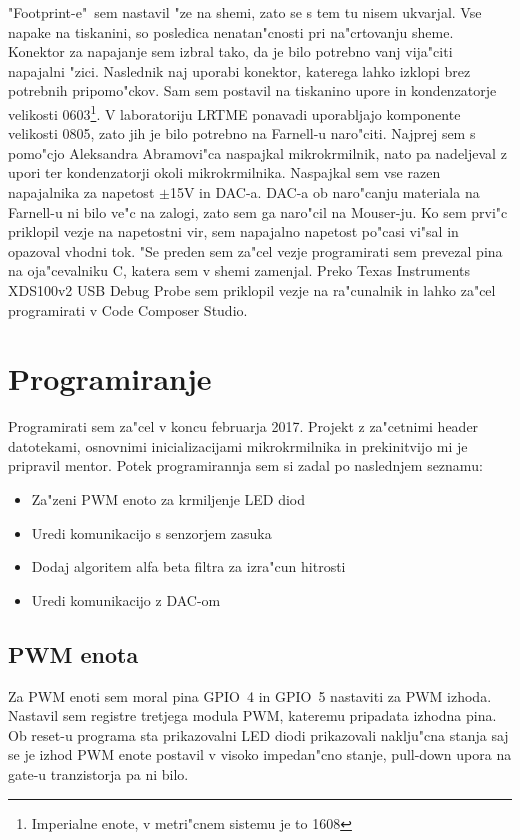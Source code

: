 \documentclass[a4paper]{article}
\begin{document}
 
 "Footprint-e"~sem nastavil "ze na shemi, zato se s tem tu nisem ukvarjal. Vse napake na tiskanini, so posledica nenatan"cnosti pri na"crtovanju sheme. Konektor za napajanje sem izbral tako, da je bilo potrebno vanj vija"citi napajalni "zici. Naslednik naj uporabi konektor, katerega lahko izklopi brez potrebnih pripomo"ckov. Sam sem postavil na tiskanino upore in kondenzatorje velikosti 0603\footnote{Imperialne enote, v metri"cnem sistemu je to 1608}. V laboratoriju LRTME ponavadi uporabljajo komponente velikosti 0805, zato jih je bilo potrebno na Farnell-u naro"citi. Najprej sem s pomo"cjo Aleksandra Abramovi"ca naspajkal mikrokrmilnik, nato pa nadeljeval z upori ter kondenzatorji okoli mikrokrmilnika. Naspajkal sem vse razen napajalnika za napetost $\mathrm{\pm}$15V in DAC-a. DAC-a ob naro"canju materiala na Farnell-u ni bilo ve"c na zalogi, zato sem ga naro"cil na Mouser-ju. Ko sem prvi"c priklopil vezje na napetostni vir, sem napajalno napetost po"casi vi"sal in opazoval vhodni tok. "Se preden sem za"cel vezje programirati sem prevezal pina na oja"cevalniku C, katera sem v shemi zamenjal. Preko Texas Instruments XDS100v2 USB Debug Probe sem priklopil vezje na ra"cunalnik in lahko za"cel programirati v Code Composer Studio.

\section{Programiranje}
Programirati sem za"cel v koncu februarja 2017.
Projekt z za"cetnimi header datotekami, osnovnimi inicializacijami mikrokrmilnika in prekinitvijo mi je pripravil mentor. Potek programirannja sem si zadal po naslednjem seznamu:
\begin{itemize}
\item Za"zeni PWM enoto za krmiljenje LED diod
\item Uredi komunikacijo s senzorjem zasuka
\item Dodaj algoritem alfa beta filtra za izra"cun hitrosti
\item Uredi komunikacijo z DAC-om
\end{itemize}

\subsection{PWM enota}

Za PWM enoti sem moral pina GPIO~4 in GPIO~5 nastaviti za PWM izhoda. Nastavil sem registre tretjega modula PWM, kateremu pripadata izhodna pina. Ob \mbox{reset-u} programa sta prikazovalni LED diodi prikazovali naklju"cna stanja saj se je izhod PWM enote postavil v visoko impedan"cno stanje, pull-down upora na gate-u tranzistorja pa ni bilo.
\end{document}
